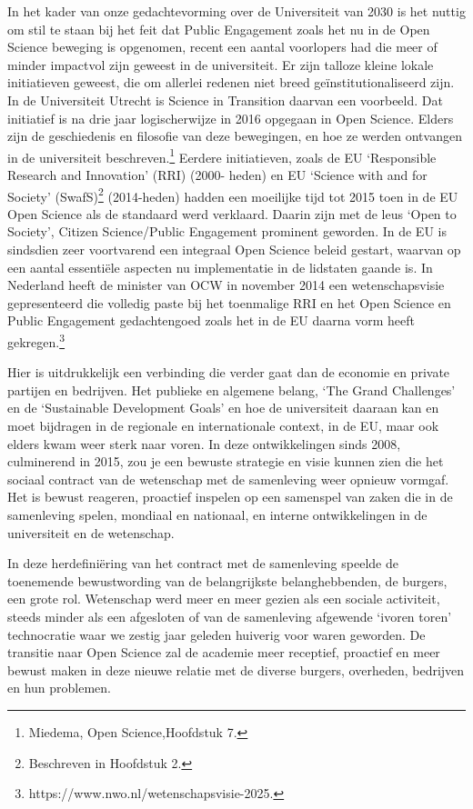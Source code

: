 \documentclass[empirical, authordate, ]{new-jote-article}
\begin{document}
	In het kader van onze gedachtevorming over de Universiteit van 2030 is het nuttig om stil te staan bij het feit dat Public Engagement zoals het nu in de Open Science beweging is opgenomen, recent een aantal voorlopers had die meer of minder impactvol zijn geweest in de universiteit. Er zijn talloze kleine lokale initiatieven geweest, die om allerlei redenen niet breed geïnstitutionaliseerd zijn. In de Universiteit Utrecht is Science in Transition daarvan een voorbeeld. Dat initiatief is na drie jaar logischerwijze in 2016 opgegaan in Open Science. Elders zijn de geschiedenis en filosofie van deze bewegingen, en hoe ze werden ontvangen in de universiteit beschreven.\footnote{Miedema, Open Science,Hoofdstuk 7. } Eerdere initiatieven, zoals de EU ‘Responsible Research and Innovation' (RRI) (2000- heden) en EU ‘Science with and for Society' (SwafS)\footnote{Beschreven in Hoofdstuk 2.} (2014-heden) hadden een moeilijke tijd tot 2015 toen in de EU Open Science als de standaard werd verklaard. Daarin zijn met de leus ‘Open to Society', Citizen Science/Public Engagement prominent geworden. In de EU is sindsdien zeer voortvarend een integraal Open Science beleid gestart, waarvan op een aantal essentiële aspecten nu implementatie in de lidstaten gaande is. In Nederland heeft de minister van OCW in november 2014 een wetenschapsvisie gepresenteerd die volledig paste bij het toenmalige RRI en het Open Science en Public Engagement gedachtengoed zoals het in de EU daarna vorm heeft gekregen.\footnote{https://www.nwo.nl/wetenschapsvisie-2025.}



	Hier is uitdrukkelijk een verbinding die verder gaat dan de economie en private partijen en bedrijven. Het publieke en algemene belang, ‘The Grand Challenges' en de ‘Sustainable Development Goals' en hoe de universiteit daaraan kan en moet bijdragen in de regionale en internationale context, in de EU, maar ook elders kwam weer sterk naar voren. In deze ontwikkelingen sinds 2008, culminerend in 2015, zou je een bewuste strategie en visie kunnen zien die het sociaal contract van de wetenschap met de samenleving weer opnieuw vormgaf. Het is bewust reageren, proactief inspelen op een samenspel van zaken die in de samenleving spelen, mondiaal en nationaal, en interne ontwikkelingen in de universiteit en de wetenschap.



	In deze herdefiniëring van het contract met de samenleving speelde de toenemende bewustwording van de belangrijkste belanghebbenden, de burgers, een grote rol. Wetenschap werd meer en meer gezien als een sociale activiteit, steeds minder als een afgesloten of van de samenleving afgewende ‘ivoren toren' technocratie waar we zestig jaar geleden huiverig voor waren geworden. De transitie naar Open Science zal de academie meer receptief, proactief en meer bewust maken in deze nieuwe relatie met de diverse burgers, overheden, bedrijven en hun problemen.
\end{document}
